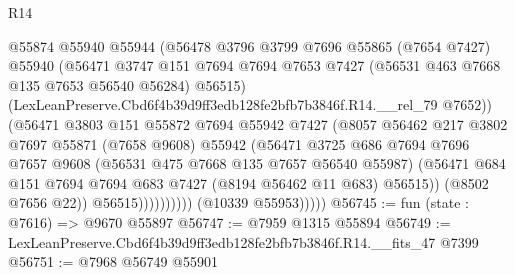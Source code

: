 \begin{lexlean}{R14}
\begin{coremodule}
                              @55874
                              @55940
                              @55944
                              (@56478
                                @3796
                                @3799
                                @7696
                                @55865
                                (@7654 @7427)
                                @55940
                                (@56471
                                  @3747
                                  @151
                                  @7694
                                  @7694
                                  @7653
                                  @7427
                                  (@56531 @463 @7668 @135 @7653 @56540 @56284)
                                  @56515)
                                (LexLeanPreserve.Cbd6f4b39d9ff3edb128fe2bfb7b3846f.R14.__rel_79
                                  @7652))
                              (@56471
                                @3803
                                @151
                                @55872
                                @7694
                                @55942
                                @7427
                                (@8057
                                  @56462
                                  @217
                                  @3802
                                  @7697
                                  @55871
                                  (@7658 @9608)
                                  @55942
                                  (@56471
                                    @3725
                                    @686
                                    @7694
                                    @7696
                                    @7657
                                    @9608
                                    (@56531 @475 @7668 @135 @7657 @56540 @55987)
                                    (@56471
                                      @684
                                      @151
                                      @7694
                                      @7694
                                      @683
                                      @7427
                                      (@8194 @56462 @11 @683)
                                      @56515))
                                  (@8502 @7656 @22))
                                @56515))))))))))
            (@10339 @55953)))))
@56745 := fun (state : @7616) => @9670 @55897
@56747 := @7959 @1315 @55894
@56749 := LexLeanPreserve.Cbd6f4b39d9ff3edb128fe2bfb7b3846f.R14.__fits_47 @7399
@56751 := @7968 @56749 @55901

\end{coremodule}
\end{lexlean}
